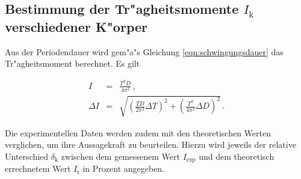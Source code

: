 		\subsection{Bestimmung der Tr"agheitsmomente $I_\mathrm{k}$ verschiedener K"orper}
		\label{subsec:versch_momente}

			Aus der Periodendauer wird gem"a"s Gleichung \eqref{eqn:schwingungsdauer} das Tr"agheitsmoment berechnet.
			Es gilt

			\begin{eqnarray*}
				I & = & \frac{T^2 D}{4 \pi^2} \,, \\
				\Delta I & = & \sqrt{\left(\frac{TD}{2 \pi^2} \Delta T\right)^2 + \left(\frac{T^2}{4 \pi^2} \Delta D\right)^2} \,.
			\end{eqnarray*}

			Die experimentellen Daten werden zudem mit den theoretischen Werten verglichen, um ihre Aussagekraft zu beurteilen.
			Hierzu wird jeweils der relative Unterschied $\delta_\mathrm{k}$ zwischen dem gemessenem Wert $I_\mathrm{exp}$ und dem theoretisch errechnetem Wert $I_\mathrm{t}$ in Prozent angegeben.

			\clearpage
